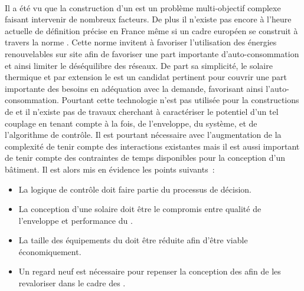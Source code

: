 \paragraph{} %
Il a été vu que la construction d’un  est un problème multi-objectif complexe
faisant intervenir de nombreux facteurs. De plus il n’existe pas encore à l’heure actuelle
de définition précise en France même si un cadre européen se construit à travers la norme
. Cette norme invitent à favoriser l’utilisation des énergies renouvelables
sur site afin de favoriser une part importante d’auto-consommation et ainsi limiter le
déséquilibre des réseaux. De part sa simplicité, le solaire thermique et par extension
le  est un candidat pertinent pour couvrir une part importante des besoins
en adéquation avec la demande, favorisant ainsi l’auto-consommation. Pourtant cette
technologie n’est pas utilisée pour la constructions de  et il n’existe
pas de travaux cherchant à caractériser le potentiel d’un tel couplage en tenant
compte à la fois, de l’enveloppe, du système, et de l’algorithme de contrôle.
Il est pourtant nécessaire avec l’augmentation de la complexité de tenir compte
des interactions existantes mais il est aussi important de tenir compte des contraintes
de temps disponibles pour la conception d’un bâtiment. Il est alors mis en évidence les
points suivants~:
\begin{itemize}
    \item La logique de contrôle doit faire partie du processus de décision.
    \item La conception d’une  solaire doit être le compromis entre qualité
          de l’enveloppe et performance du .
    \item La taille des équipements du  doit être réduite afin d’être viable
          économiquement.
    \item Un regard neuf est nécessaire pour repenser la conception des 
          afin de les revaloriser dans le cadre des .
\end{itemize}


